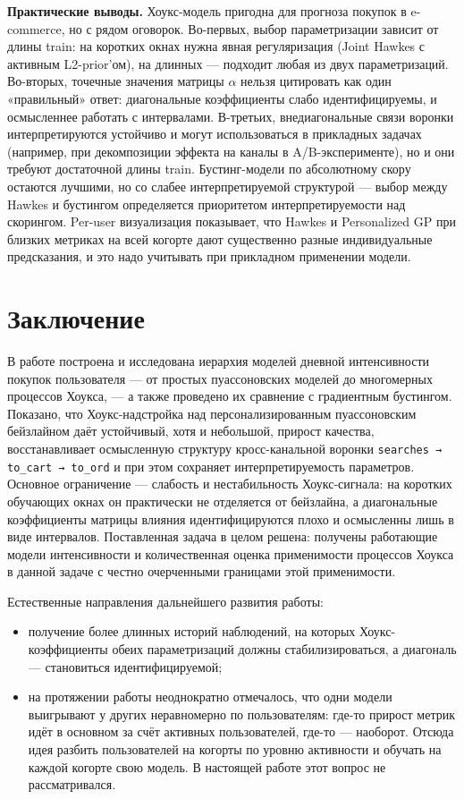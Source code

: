 \documentclass[12pt,a4paper]{article}
\begin{document}
\textbf{Практические выводы.} Хоукс-модель пригодна для прогноза покупок в e-commerce, но с рядом оговорок. Во-первых, выбор параметризации зависит от длины train: на коротких окнах нужна явная регуляризация (Joint Hawkes с активным L2-prior'ом), на длинных --- подходит любая из двух параметризаций. Во-вторых, точечные значения матрицы $\alpha $ нельзя цитировать как один «правильный» ответ: диагональные коэффициенты слабо идентифицируемы, и осмысленнее работать с интервалами. В-третьих, внедиагональные связи воронки интерпретируются устойчиво и могут использоваться в прикладных задачах (например, при декомпозиции эффекта на каналы в A/B-эксперименте), но и они требуют достаточной длины train. Бустинг-модели по абсолютному скору остаются лучшими, но со слабее интерпретируемой структурой --- выбор между Hawkes и бустингом определяется приоритетом интерпретируемости над скорингом. Per-user визуализация показывает, что Hawkes и Personalized GP при близких метриках на всей когорте дают существенно разные индивидуальные предсказания, и это надо учитывать при прикладном применении модели.

\clearpage
\section{Заключение}

В работе построена и исследована иерархия моделей дневной интенсивности покупок пользователя --- от простых пуассоновских моделей до многомерных процессов Хоукса, --- а также проведено их сравнение с градиентным бустингом. Показано, что Хоукс-надстройка над персонализированным пуассоновским бейзлайном даёт устойчивый, хотя и небольшой, прирост качества, восстанавливает осмысленную структуру кросс-канальной воронки \texttt{searches → to\_cart → to\_ord} и при этом сохраняет интерпретируемость параметров. Основное ограничение --- слабость и нестабильность Хоукс-сигнала: на коротких обучающих окнах он практически не отделяется от бейзлайна, а диагональные коэффициенты матрицы влияния идентифицируются плохо и осмысленны лишь в виде интервалов. Поставленная задача в целом решена: получены работающие модели интенсивности и количественная оценка применимости процессов Хоукса в данной задаче с честно очерченными границами этой применимости.

Естественные направления дальнейшего развития работы:

\begin{itemize}
  \item получение более длинных историй наблюдений, на которых Хоукс-коэффициенты обеих параметризаций должны стабилизироваться, а диагональ --- становиться идентифицируемой;
  \item на протяжении работы неоднократно отмечалось, что одни модели выигрывают у других неравномерно по пользователям: где-то прирост метрик идёт в основном за счёт активных пользователей, где-то --- наоборот. Отсюда идея разбить пользователей на когорты по уровню активности и обучать на каждой когорте свою модель. В настоящей работе этот вопрос не рассматривался.
\end{itemize}
\end{document}
